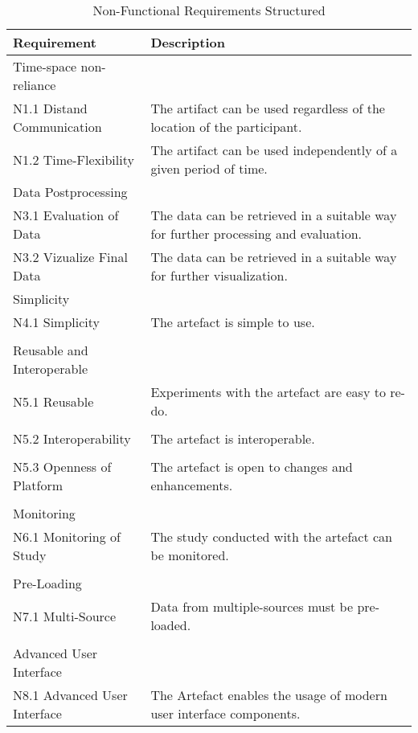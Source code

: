 \begin{table}
    \centering
    \small
    \begin{tabular}{L{0.35\textwidth}L{0.59\textwidth}}
    \hline
Requirement                             & Description \\ \hline
    Time-space non-reliance     &             \\ \hline
    N1.1 Distand Communication      & The artifact can be used regardless of the location of the participant.            \\
    N1.2 Time-Flexibility           & The artifact can be used independently of a given period of time.            \\ \hline
    Data Postprocessing &             \\ \hline
    N3.1 Evaluation of Data         & The data can be retrieved in a suitable way for further processing and evaluation.            \\
    N3.2 Vizualize Final Data       & The data can be retrieved in a suitable way for further visualization.             \\ \hline
    Simplicity                  &            \\ \hline
    N4.1 Simplicity                 & The artefact is simple to use.           \\
    & \\ \hline
    Reusable and Interoperable  &             \\ \hline
    N5.1 Reusable                   & Experiments with the artefact are easy to re-do.           \\
    & \\
    N5.2 Interoperability           & The artefact is interoperable.            \\
    & \\
    N5.3 Openness of Platform       & The artefact is open to changes and enhancements. \\
    & \\ \hline
    Monitoring                  &             \\ \hline
    N6.1 Monitoring of Study        & The study conducted with the artefact can be monitored.            \\ 
    & \\ \hline
    Pre-Loading                 &             \\ \hline
    N7.1 Multi-Source             & Data from multiple-sources must be pre-loaded.            \\ 
    & \\ \hline
    Advanced User Interface   &             \\ \hline
    N8.1 Advanced User Interface  & The Artefact enables the usage of modern user interface components.            \\ \hline
    \end{tabular}
    \caption[Non-Functional Requirements Structured]{Non-Functional Requirements Structured}\label{tab:NonFuncRequirementsCat}
    \end{table}
